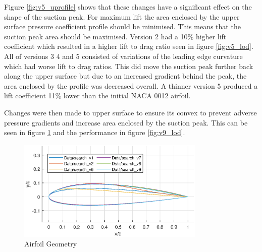 \documentclass{article}
\begin{document}
Figure \ref{fig:v5_uprofile} shows that these changes have a significant effect on the shape of the suction peak.
For maximum lift the area enclosed by the upper surface pressure coefficient profile should be minimised.
This means that the suction peak area should be maximised.
Version 2 had a 10\% higher lift coefficient which resulted in a higher lift to drag ratio seen in figure \ref{fig:v5_lod}.
All of versions 3 4 and 5 consisted of variations of the leading edge curvature which had worse lift to drag ratios.
This did move the suction peak further back along the upper surface but due to an increased gradient behind the peak,
the area enclosed by the profile was decreased overall.
A thinner version 5 produced a lift coefficient 11\% lower than the initial NACA 0012 airfoil.

Changes were then made to upper surface to ensure its convex to prevent adverse pressure gradients and increase area enclosed by the suction peak.
This can be seen in figure \ref{fig:v9_geometry} and the performance in figure \ref{fig:v9_lod}.

\begin{figure}[H]
    \centering
    \includegraphics[width=0.8\textwidth]{figures/hiRe_geometry_9.eps}
    \caption{Airfoil Geometry}
    \label{fig:v9_geometry}
\end{figure}
\end{document}
